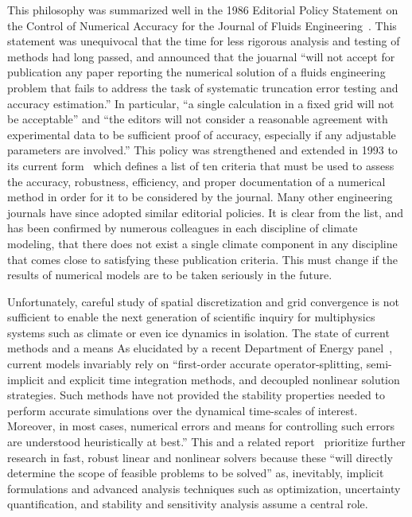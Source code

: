 This philosophy was summarized well in the 1986 Editorial Policy Statement on the Control of Numerical Accuracy for the Journal of Fluids Engineering~\cite{roache1986editorial}.
This statement was unequivocal that the time for less rigorous analysis and testing of methods had long passed, and announced that the jouarnal ``will not accept for publication any paper reporting the numerical solution of a fluids engineering problem that fails to address the task of systematic truncation error testing and accuracy estimation.''
In particular, ``a single calculation in a fixed grid will not be acceptable'' and ``the editors will not consider a reasonable agreement with experimental data to be sufficient proof of accuracy, especially if any adjustable parameters are involved.''
This policy was strengthened and extended in 1993 to its current form~\cite{jfe2004numaccuracy} which defines a list of ten criteria that must be used to assess the accuracy, robustness, efficiency, and proper documentation of a numerical method in order for it to be considered by the journal.
Many other engineering journals have since adopted similar editorial policies.
It is clear from the list, and has been confirmed by numerous colleagues in each discipline of climate modeling, that there does not exist a single climate component in any discipline that comes close to satisfying these publication criteria.
This must change if the results of numerical models are to be taken seriously in the future.

Unfortunately, careful study of spatial discretization and grid convergence is not sufficient to enable the next generation of scientific inquiry for multiphysics systems such as climate or even ice dynamics in isolation.
The state of current methods and a means 
As elucidated by a recent Department of Energy panel~\cite{simon2007modeling}, current models invariably rely on ``first-order accurate operator-splitting, semi-implicit and explicit time integration methods, and decoupled nonlinear solution strategies.
Such methods have not provided the stability properties needed to perform accurate simulations over the dynamical time-scales of interest.
Moreover, in most cases, numerical errors and means for controlling such errors are understood heuristically at best.''
This and a related report~\cite{washington2009scientific} prioritize further research in fast, robust linear and nonlinear solvers because these ``will directly determine the scope of feasible problems to be solved'' as, inevitably, implicit formulations and advanced analysis techniques such as optimization, uncertainty quantification, and stability and sensitivity analysis assume a central role.

